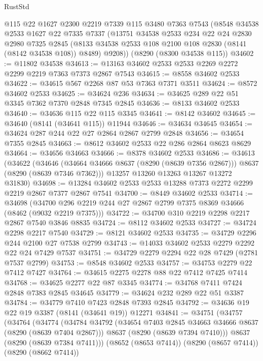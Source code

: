 \begin{lexlean}{RustStd}
\begin{coremodule}
    @115
    @22
    @1627
    @2300
    @2219
    @7339
    @115
    @3480
    @7363
    @7543
    (@8548
      @34538
      @2533
      @1627
      @22
      @7335
      @7337
      (@13751
        @34538
        @2533
        @234
        @22
        @24
        @2830
        @2980
        @7325
        @2845
        (@8133 @34538 @2533 @108 @2100 @108 @2830 (@8141 (@8142 @34538 @108)) @8489)
        @9208))
    (@8290 (@8300 @34538 @115))
@34602 := @11802 @34538
@34613 := @13163 @34602 @2533 @2533 @2269 @2272 @2299 @2219 @7363 @7373 @2867 @7543
@34615 := @8558 @34602 @2533
@34622 := @34615 @567 @2268 @87 @53 @7363 @7371 @3511
@34624 := @8572 @34602 @2533
@34625 := @34624 @236
@34634 := @34625 @289 @22 @51 @3345 @7362 @7370 @2848 @7345 @2845
@34636 := @8133 @34602 @2533
@34640 := @34636 @115 @22 @115 @3345
@34641 := @8142 @34602
@34645 := @34640 (@8141 (@34641 @115)) @11944
@34646 := @34634 @34645
@34654 := @34624 @287 @244 @22 @27 @2864 @2867 @2799 @2848
@34656 := @34654 @7355 @2845
@34663 := @8612 @34602 @2533 @22 @286 @2864 @8623 @8629
@34664 := @34656 @34663
@34666 := @8378 @34602 @2533
@34686 := @34613
    (@34622
      (@34646 (@34664 @34666 @8637 (@8290 (@8639 @7356 @2867))) @8637 (@8290 (@8639 @7346 @7362)))
      @13257
      @13260
      @13263
      @13267
      @13272
      @31830)
@34698 := @13284 @34602 @2533 @2533 @13288 @7373 @2272 @2299 @2219 @2867 @7377 @2867 @7541
@34700 := @8449 @34602 @2533
@34714 := @34698
    (@34700 @296 @2219 @244 @27 @2867 @2799 @7375 @8369 @34666 (@8462 (@9032 @2219 @7375)))
@34722 := @34700 @310 @2219 @2298 @2217 @2867 @7540 @3846 @8835
@34724 := @8112 @34602 @2533
@34727 := @34724 @2298 @2217 @7540
@34729 := @8121 @34602 @2533
@34735 := @34729 @2296 @244 @2100 @27 @7538 @2799
@34743 := @14033 @34602 @2533 @2279 @2292 @22 @24 @7429 @7537
@34751 := @34729 @2279 @2294 @22 @28 @7429 (@2781 @7537 @2799)
@34753 := @8548 @34602 @2533
@34757 := @34753 @2279 @22 @7412 @7427
@34764 := @34615 @2275 @2278 @88 @22 @7412 @7425 @7414
@34768 := @34625 @2277 @22 @87 @3345
@34774 := @34768 @7411 @7424 @2848 @7383 @2845 @34645
@34779 := @34624 @232 @289 @22 @51 @3387
@34784 := @34779 @7410 @7423 @2848 @7393 @2845
@34792 := @34636 @19 @22 @19 @3387 (@8141 (@34641 @19)) @12271
@34841 := @34751
    (@34757
      (@34764
        (@34774
          (@34784
            @34792
            (@34654 @7403 @2845 @34663 @34666 @8637 (@8290 (@8639 @7404 @2867)))
            @8637
            (@8290 (@8639 @7394 @7410)))
          @8637
          (@8290 (@8639 @7384 @7411)))
        (@8652 (@8653 @7414))
        (@8290 (@8657 @7414))
        (@8290 (@8662 @7414))

\end{coremodule}
\end{lexlean}
